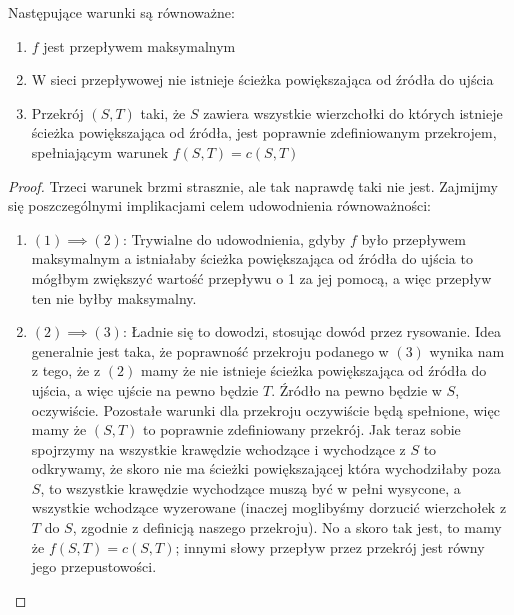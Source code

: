     \begin{theorem}
        Następujące warunki są równoważne:
        \begin{enumerate}
            \item $f$ jest przepływem maksymalnym
            \item W sieci przepływowej nie istnieje ścieżka powiększająca od źródła do ujścia
            \item Przekrój $(S,T)$ taki, że $S$ zawiera wszystkie wierzchołki do których istnieje ścieżka powiększająca od źródła, jest poprawnie zdefiniowanym przekrojem, spełniającym warunek $f(S,T) = c(S,T)$
        \end{enumerate}
    \end{theorem}

    \begin{proof}
        Trzeci warunek brzmi strasznie, ale tak naprawdę taki nie jest. Zajmijmy się poszczególnymi implikacjami celem udowodnienia równoważności:
        \begin{enumerate}
            \item $(1) \implies (2)$: Trywialne do udowodnienia, gdyby $f$ było przepływem maksymalnym a istniałaby ścieżka powiększająca od źródła do ujścia to mógłbym zwiększyć wartość przepływu o 1 za jej pomocą, a więc przepływ ten nie byłby maksymalny.
            \item $(2) \implies (3)$: Ładnie się to dowodzi, stosując dowód przez rysowanie. Idea generalnie jest taka, że poprawność przekroju podanego w $(3)$ wynika nam z tego, że z $(2)$ mamy że nie istnieje ścieżka powiększająca od źródła do ujścia, a więc ujście na pewno będzie $T$. Źródło na pewno będzie w $S$, oczywiście. Pozostałe warunki dla przekroju oczywiście będą spełnione, więc mamy że $(S,T)$ to poprawnie zdefiniowany przekrój. Jak teraz sobie spojrzymy na wszystkie krawędzie wchodzące i wychodzące z $S$ to odkrywamy, że skoro nie ma ścieżki powiększającej która wychodziłaby poza $S$, to wszystkie krawędzie wychodzące muszą być w pełni wysycone, a wszystkie wchodzące wyzerowane (inaczej moglibyśmy dorzucić wierzchołek z $T$ do $S$, zgodnie z definicją naszego przekroju). No a skoro tak jest, to mamy że $f(S,T) = c(S,T)$; innymi słowy przepływ przez przekrój jest równy jego przepustowości. 
            

\end{enumerate}
\end{proof}
